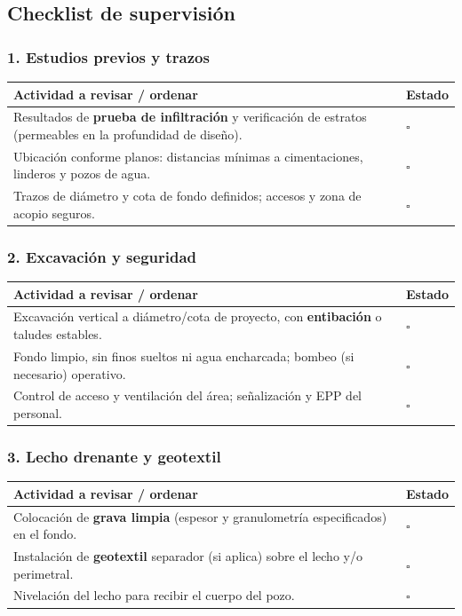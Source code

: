 \documentclass[12pt]{article}
\newcommand{\cbox}{\(\square\)}
\renewcommand{\cbox}{\(\square\)} %
\begin{document}
	\subsection{Checklist de supervisión}
	
	\subsubsection*{1. Estudios previos y trazos}
	\begin{tabularx}{\linewidth}{>{\raggedright\arraybackslash}p{0.93\linewidth} >{\centering\arraybackslash}m{0.07\linewidth}}
		\toprule
		\textbf{Actividad a revisar / ordenar} & \textbf{Estado}\\
		\midrule
		Resultados de \textbf{prueba de infiltración} y verificación de estratos (permeables en la profundidad de diseño). & \cbox \\
		Ubicación conforme planos: distancias mínimas a cimentaciones, linderos y pozos de agua. & \cbox \\
		Trazos de diámetro y cota de fondo definidos; accesos y zona de acopio seguros. & \cbox \\
		\bottomrule
	\end{tabularx}
	
	\subsubsection*{2. Excavación y seguridad}
	\begin{tabularx}{\linewidth}{>{\raggedright\arraybackslash}p{0.93\linewidth} >{\centering\arraybackslash}m{0.07\linewidth}}
		\toprule
		\textbf{Actividad a revisar / ordenar} & \textbf{Estado}\\
		\midrule
		Excavación vertical a diámetro/cota de proyecto, con \textbf{entibación} o taludes estables. & \cbox \\
		Fondo limpio, sin finos sueltos ni agua encharcada; bombeo (si necesario) operativo. & \cbox \\
		Control de acceso y ventilación del área; señalización y EPP del personal. & \cbox \\
		\bottomrule
	\end{tabularx}
	
	\subsubsection*{3. Lecho drenante y geotextil}
	\begin{tabularx}{\linewidth}{>{\raggedright\arraybackslash}p{0.93\linewidth} >{\centering\arraybackslash}m{0.07\linewidth}}
		\toprule
		\textbf{Actividad a revisar / ordenar} & \textbf{Estado}\\
		\midrule
		Colocación de \textbf{grava limpia} (espesor y granulometría especificados) en el fondo. & \cbox \\
		Instalación de \textbf{geotextil} separador (si aplica) sobre el lecho y/o perimetral. & \cbox \\
		Nivelación del lecho para recibir el cuerpo del pozo. & \cbox \\
		\bottomrule
	\end{tabularx}
	
\end{document}
